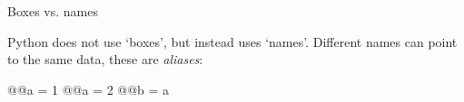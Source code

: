 \documentclass[xetex,10pt]{beamer}
\def\imgpath{../00-img/}
\def\spacer{\vspace*{1em}}
\begin{document}
\begin{frame}[fragile]{Boxes vs. names}
	
	Python does not use `boxes', but instead uses `names'. Different names can point to the same data, these are \emph{aliases}:

	\spacer

	\begin{python}
	@@a = 1
	@@a = 2
	@@b = a
	\end{python}
	
	\spacer
	
	\begin{center}
	\end{center}
\end{frame}

%	
%
%
%
%	
%
\end{document}
